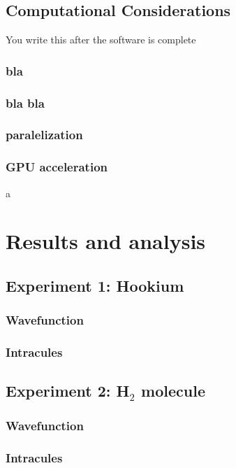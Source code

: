 \documentclass[final,3p,times,twocolumn]{elsarticle}
\begin{document}
	\subsection{Computational Considerations}
	You write this after the software is complete
	
	
	\subsubsection{bla}
	\subsubsection{bla bla}
	\subsubsection{paralelization}
	\subsubsection{GPU acceleration}
	
	\newpage
		a
	\newpage
	\section{Results and analysis}
	\label{sec:results}
	\subsection{Experiment 1: Hookium}
	\subsubsection{Wavefunction}
	\subsubsection{Intracules}

	\subsection{Experiment 2: H${}_2$ molecule}
	\subsubsection{Wavefunction}
	\subsubsection{Intracules}
	
\end{document}
